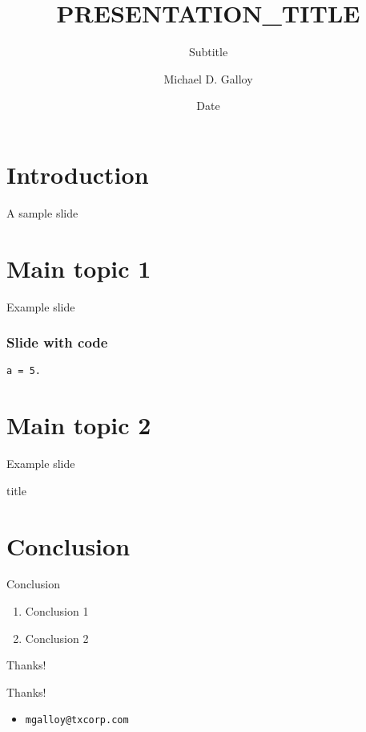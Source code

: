\documentclass{beamer}
\title{PRESENTATION_TITLE}
\subtitle{Subtitle}
\author{Michael D. Galloy}
\institute[Tech-X Corporation]{Tech-X Corporation}
\date{Date}
\begin{document}
\begin{frame}[plain]
  \titlepage
\end{frame}


\section{Introduction}


\begin{frame}{A sample slide}
\end{frame}


\section{Main topic 1}


\begin{frame}{Example slide}
\end{frame}

\begin{frame}[fragile]
  \frametitle{Slide with code}
  \begin{lstlisting}a = 5.
  \end{lstlisting}
\end{frame}


\section{Main topic 2}


\begin{frame}{Example slide}
\end{frame}

\begin{frame}{title}
\end{frame}


\section{Conclusion}


\begin{frame}{Conclusion}
  \begin{enumerate}
    \item Conclusion 1
    \item Conclusion 2
  \end{enumerate}
\end{frame}

\begin{frame}{Thanks!}
  \begin{center}{\huge Thanks!}\end{center}
  \begin{itemize}
    \item {\tt mgalloy@txcorp.com}
  \end{itemize}
\end{frame}
\end{document}
